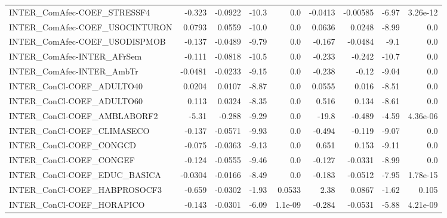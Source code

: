 \begin{tabular}{lrrrrrrrr}
INTER\_ComAfec-COEF\_STRESSF4            &      -0.323 &      -0.0922 &   -10.3 &      0.0 &    -0.0413 &    -0.00585 &        -6.97 &      3.26e-12 \\
INTER\_ComAfec-COEF\_USOCINTURON         &      0.0793 &       0.0559 &   -10.0 &      0.0 &     0.0636 &      0.0248 &        -8.99 &           0.0 \\
INTER\_ComAfec-COEF\_USODISPMOB          &      -0.137 &      -0.0489 &   -9.79 &      0.0 &     -0.167 &     -0.0484 &         -9.1 &           0.0 \\
INTER\_ComAfec-INTER\_AFrSem             &      -0.111 &      -0.0818 &   -10.5 &      0.0 &     -0.233 &      -0.242 &        -10.7 &           0.0 \\
INTER\_ComAfec-INTER\_AmbTr              &     -0.0481 &      -0.0233 &   -9.15 &      0.0 &     -0.238 &       -0.12 &        -9.04 &           0.0 \\
INTER\_ConCl-COEF\_ADULTO40              &      0.0204 &       0.0107 &   -8.87 &      0.0 &     0.0555 &       0.016 &        -8.51 &           0.0 \\
INTER\_ConCl-COEF\_ADULTO60              &       0.113 &       0.0324 &   -8.35 &      0.0 &      0.516 &       0.134 &        -8.61 &           0.0 \\
INTER\_ConCl-COEF\_AMBLABORF2            &       -5.31 &       -0.288 &   -9.29 &      0.0 &      -19.8 &      -0.489 &        -4.59 &      4.36e-06 \\
INTER\_ConCl-COEF\_CLIMASECO             &      -0.137 &      -0.0571 &   -9.93 &      0.0 &     -0.494 &      -0.119 &        -9.07 &           0.0 \\
INTER\_ConCl-COEF\_CONGCD                &      -0.075 &      -0.0363 &   -9.13 &      0.0 &      0.651 &       0.153 &        -9.11 &           0.0 \\
INTER\_ConCl-COEF\_CONGEF                &      -0.124 &      -0.0555 &   -9.46 &      0.0 &     -0.127 &     -0.0331 &        -8.99 &           0.0 \\
INTER\_ConCl-COEF\_EDUC\_BASICA           &     -0.0304 &      -0.0166 &   -8.49 &      0.0 &     -0.183 &     -0.0512 &        -7.95 &      1.78e-15 \\
INTER\_ConCl-COEF\_HABPROSOCF3           &      -0.659 &      -0.0302 &   -1.93 &   0.0533 &       2.38 &      0.0867 &        -1.62 &         0.105 \\
INTER\_ConCl-COEF\_HORAPICO              &      -0.143 &      -0.0301 &   -6.09 &  1.1e-09 &     -0.284 &     -0.0531 &        -5.88 &      4.21e-09 \\

\end{tabular}
